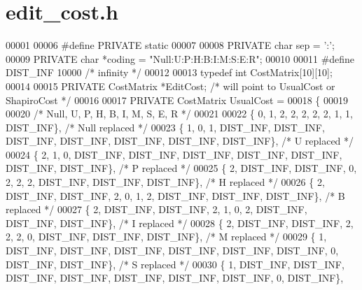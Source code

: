 \hypertarget{edit__cost_8h_source}{}\section{edit\+\_\+cost.\+h}
\label{edit__cost_8h_source}

\begin{DoxyCode}
00001 
00006 \textcolor{preprocessor}{#define PRIVATE static}
00007 
00008 PRIVATE \textcolor{keywordtype}{char}   sep    = \textcolor{charliteral}{':'};
00009 PRIVATE \textcolor{keywordtype}{char}  *coding = \textcolor{stringliteral}{"Null:U:P:H:B:I:M:S:E:R"};
00010 
00011 \textcolor{preprocessor}{#define DIST\_INF 10000  }\textcolor{comment}{/* infinity */}\textcolor{preprocessor}{}
00012 
00013 \textcolor{keyword}{typedef} \textcolor{keywordtype}{int} CostMatrix[10][10];
00014 
00015 PRIVATE CostMatrix *EditCost;  \textcolor{comment}{/* will point to UsualCost or ShapiroCost */}
00016 
00017 PRIVATE CostMatrix  UsualCost =
00018 \{
00019 
00020 \textcolor{comment}{/*    Null,       U,        P,        H,        B,        I,        M,        S,        E,        R     */}
00021 
00022    \{        0,        1,        2,        2,        2,        2,        2,        1,        1, DIST\_INF\},  
       \textcolor{comment}{/* Null replaced */}
00023    \{        1,        0,        1, DIST\_INF, DIST\_INF, DIST\_INF, DIST\_INF, DIST\_INF, DIST\_INF, DIST\_INF\},  
       \textcolor{comment}{/* U    replaced */}
00024    \{        2,        1,        0, DIST\_INF, DIST\_INF, DIST\_INF, DIST\_INF, DIST\_INF, DIST\_INF, DIST\_INF\},  
       \textcolor{comment}{/* P    replaced */}
00025    \{        2, DIST\_INF, DIST\_INF,        0,        2,        2,        2, DIST\_INF, DIST\_INF, DIST\_INF\},  
       \textcolor{comment}{/* H    replaced */}
00026    \{        2, DIST\_INF, DIST\_INF,        2,        0,        1,        2, DIST\_INF, DIST\_INF, DIST\_INF\},  
       \textcolor{comment}{/* B    replaced */}
00027    \{        2, DIST\_INF, DIST\_INF,        2,        1,        0,        2, DIST\_INF, DIST\_INF, DIST\_INF\},  
       \textcolor{comment}{/* I    replaced */}
00028    \{        2, DIST\_INF, DIST\_INF,        2,        2,        2,        0, DIST\_INF, DIST\_INF, DIST\_INF\},  
       \textcolor{comment}{/* M    replaced */}
00029    \{        1, DIST\_INF, DIST\_INF, DIST\_INF, DIST\_INF, DIST\_INF, DIST\_INF,        0, DIST\_INF, DIST\_INF\},  
       \textcolor{comment}{/* S    replaced */}
00030    \{        1, DIST\_INF, DIST\_INF, DIST\_INF, DIST\_INF, DIST\_INF, DIST\_INF, DIST\_INF,        0, DIST\_INF\},  

\end{DoxyCode}
